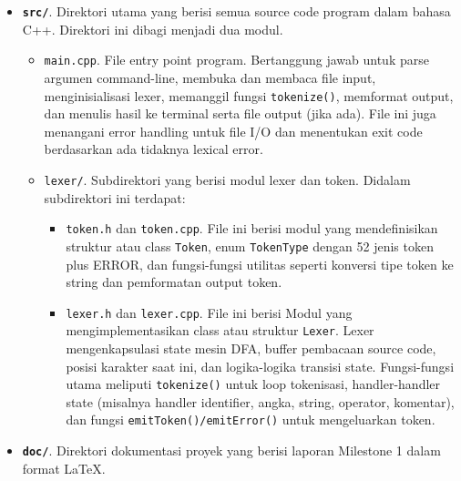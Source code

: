 \begin{itemize}
    \item \textbf{\texttt{src/}}. Direktori utama yang berisi semua source code program dalam bahasa C++. Direktori ini dibagi menjadi dua modul.
          \begin{itemize}
              \item \texttt{main.cpp}. File entry point program. Bertanggung jawab untuk parse argumen command-line, membuka dan membaca file input, menginisialisasi lexer, memanggil fungsi \texttt{tokenize()}, memformat output, dan menulis hasil ke terminal serta file output (jika ada). File ini juga menangani error handling untuk file I/O dan menentukan exit code berdasarkan ada tidaknya lexical error.

              \item \texttt{lexer/}. Subdirektori yang berisi modul lexer dan token. Didalam subdirektori ini terdapat:
                    \begin{itemize}
                        \item \texttt{token.h} dan \texttt{token.cpp}. File ini berisi modul yang mendefinisikan struktur atau class \texttt{Token}, enum \texttt{TokenType} dengan 52 jenis token plus ERROR, dan fungsi-fungsi utilitas seperti konversi tipe token ke string dan pemformatan output token.

                        \item \texttt{lexer.h} dan \texttt{lexer.cpp}. File ini berisi Modul yang mengimplementasikan class atau struktur \texttt{Lexer}. Lexer mengenkapsulasi state mesin DFA, buffer pembacaan source code, posisi karakter saat ini, dan logika-logika transisi state. Fungsi-fungsi utama meliputi \texttt{tokenize()} untuk loop tokenisasi, handler-handler state (misalnya handler identifier, angka, string, operator, komentar), dan fungsi \texttt{emitToken()/emitError()} untuk mengeluarkan token.
                    \end{itemize}
          \end{itemize}

    \item \textbf{\texttt{doc/}}. Direktori dokumentasi proyek yang berisi laporan Milestone 1 dalam format LaTeX.


\end{itemize}
